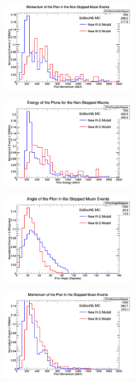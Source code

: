 \documentclass[11pt]{article}
\begin{document}
\begin{figure}[H]
\centering
\includegraphics[width=0.6\textwidth]{ANMPionPlottingImages/2-ANMPionPlotting.png}
\caption{}
\end{figure}

\begin{figure}[H]
\centering
\includegraphics[width=0.6\textwidth]{ANMPionPlottingImages/3-ANMPionPlotting.png}
\caption{}
\end{figure}

\begin{figure}[H]
\centering
\includegraphics[width=0.6\textwidth]{ANMPionPlottingImages/4-ANMPionPlotting.png}
\caption{}
\end{figure}

\begin{figure}[H]
\centering
\includegraphics[width=0.6\textwidth]{ANMPionPlottingImages/5-ANMPionPlotting.png}
\caption{}
\end{figure}
\end{document}
